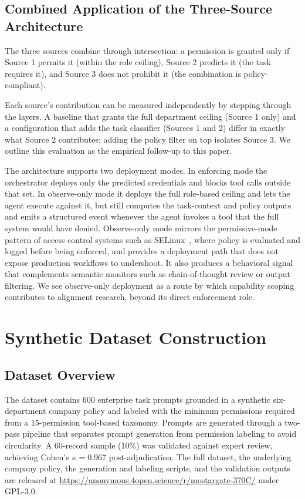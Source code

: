 \documentclass{article}
\theoremstyle{plain}
\theoremstyle{definition}
\theoremstyle{remark}
\begin{document}
\subsection{Combined Application of the Three-Source Architecture}
\label{sec:combined}
The three sources combine through intersection: a permission is granted 
only if Source 1 permits it (within the role ceiling), Source 2 predicts 
it (the task requires it), and Source 3 does not prohibit it (the 
combination is policy-compliant).

Each source's contribution can be measured independently by stepping 
through the layers. A baseline that grants the full department ceiling 
(Source 1 only) and a configuration that adds the task classifier 
(Sources 1 and 2) differ in exactly what Source 2 contributes; adding 
the policy filter on top isolates Source 3. We outline this evaluation 
as the empirical follow-up to this paper.

The architecture supports two deployment modes. In enforcing mode the 
orchestrator deploys only the predicted credentials and blocks tool calls 
outside that set. In observe-only mode it deploys the full role-based 
ceiling and lets the agent execute against it, but still computes the 
task-context and policy outputs and emits a structured event whenever 
the agent invokes a tool that the full system would have denied. 
Observe-only mode mirrors the permissive-mode pattern of access control 
systems such as SELinux~\citep{smalley2001selinux}, where policy is 
evaluated and logged before being enforced, and provides a deployment 
path that does not expose production workflows to undershoot. It also produces a behavioral signal that complements semantic monitors such as chain-of-thought review or output filtering. We see observe-only deployment as a route by which capability scoping contributes to alignment research, beyond its direct enforcement role.

\section{Synthetic Dataset Construction}
\subsection{Dataset Overview}
The dataset contains 600 enterprise task prompts grounded in a synthetic 
six-department company policy and labeled with the minimum permissions 
required from a 15-permission tool-based taxonomy. Prompts are generated 
through a two-pass pipeline that separates prompt generation from 
permission labeling to avoid circularity. A 60-record sample (10\%) was 
validated against expert review, achieving Cohen's $\kappa = 0.967$ 
post-adjudication. The full dataset, the underlying company policy, the 
generation and labeling scripts, and the validation outputs are released 
at \url{https://anonymous.4open.science/r/mostargate-370C/} under GPL-3.0.
\end{document}
